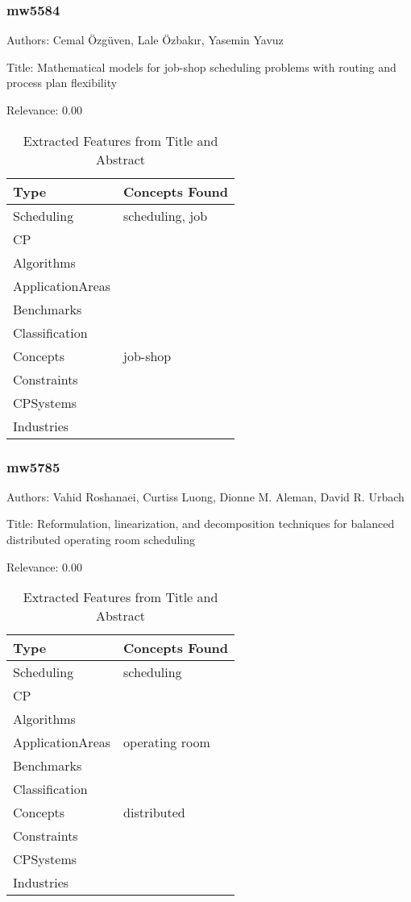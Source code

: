 \subsubsection{mw5584}
\label{mw:mw5584}

Authors: Cemal Özgüven, Lale Özbakır, Yasemin Yavuz

Title: Mathematical models for job-shop scheduling problems with routing and process plan flexibility

Relevance:  0.00

{\scriptsize
\begin{longtable}{p{2cm}p{20cm}}
\caption{Extracted Features from Title and Abstract}\\ \toprule
Type & Concepts Found\\ \midrule
\endhead
\bottomrule
\endfoot
Scheduling & scheduling, job\\ 
CP & \\ 
Algorithms & \\ 
ApplicationAreas & \\ 
Benchmarks & \\ 
Classification & \\ 
Concepts & job-shop\\ 
Constraints & \\ 
CPSystems & \\ 
Industries & \\ 
\end{longtable}
}



\subsubsection{mw5785}
\label{mw:mw5785}

Authors: Vahid Roshanaei, Curtiss Luong, Dionne M. Aleman, David R. Urbach

Title: Reformulation, linearization, and decomposition techniques for balanced distributed operating room scheduling

Relevance:  0.00

{\scriptsize
\begin{longtable}{p{2cm}p{20cm}}
\caption{Extracted Features from Title and Abstract}\\ \toprule
Type & Concepts Found\\ \midrule
\endhead
\bottomrule
\endfoot
Scheduling & scheduling\\ 
CP & \\ 
Algorithms & \\ 
ApplicationAreas & operating room\\ 
Benchmarks & \\ 
Classification & \\ 
Concepts & distributed\\ 
Constraints & \\ 
CPSystems & \\ 
Industries & \\ 
\end{longtable}
}



